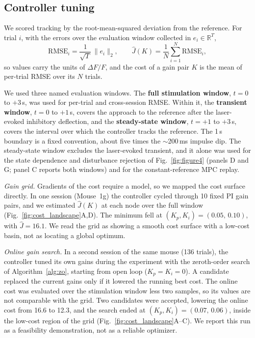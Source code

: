 \subsection*{Controller tuning}
\label{sec:gain_opt}

We scored tracking by the root-mean-squared deviation from the reference.
For trial $i$, with the errors over the evaluation window collected in $e_{i} \in \mathbb{R}^{T}$,
%
\begin{equation}
    \mathrm{RMSE}_{i} = \frac{1}{\sqrt{T}}\,\lVert e_{i} \rVert_{2},
    \qquad
    \hat{J}(K) = \frac{1}{N}\sum_{i=1}^{N}\mathrm{RMSE}_{i},
    \label{eq:trial_cost}
\end{equation}
%
so values carry the units of $\Delta F/F$, and the cost of a gain pair $K$ is the mean of per-trial RMSE over its $N$ trials.

We used three named evaluation windows.
The \textbf{full stimulation window}, $t = 0$ to $+3$\,s, was used for per-trial and cross-session RMSE.
Within it, the \textbf{transient window}, $t = 0$ to $+1$\,s, covers the approach to the reference after the laser-evoked inhibitory deflection, and the \textbf{steady-state window}, $t = +1$ to $+3$\,s, covers the interval over which the controller tracks the reference.
The 1\,s boundary is a fixed convention, about five times the $\sim$200\,ms impulse dip.
The steady-state window excludes the laser-evoked transient, and it alone was used for the state dependence and disturbance rejection of Fig.~\ref{fig:figure4} (panels D and G; panel C reports both windows) and for the constant-reference MPC replay.

\emph{Gain grid.} Gradients of the cost require a model, so we mapped the cost surface directly.
In one session (Mouse~1g) the controller cycled through 10 fixed PI gain pairs, and we estimated $\hat{J}(K)$ at each node over the full window (Fig.~\ref{fig:cost_landscape}A,D).
The minimum fell at $(K_p, K_i) = (0.05,\,0.10)$, with $\hat{J} = 16.1$.
We read the grid as showing a smooth cost surface with a low-cost basin, not as locating a global optimum.

\emph{Online gain search.} In a second session of the same mouse (136 trials), the controller tuned its own gains during the experiment with the zeroth-order search of Algorithm~\ref{alg:zo}, starting from open loop ($K_p = K_i = 0$).
A candidate replaced the current gains only if it lowered the running best cost.
The online cost was evaluated over the stimulation window less two samples, so its values are not comparable with the grid.
Two candidates were accepted, lowering the online cost from 16.6 to 12.3, and the search ended at $(K_p, K_i) = (0.07,\,0.06)$, inside the low-cost region of the grid (Fig.~\ref{fig:cost_landscape}A--C).
We report this run as a feasibility demonstration, not as a reliable optimizer.

